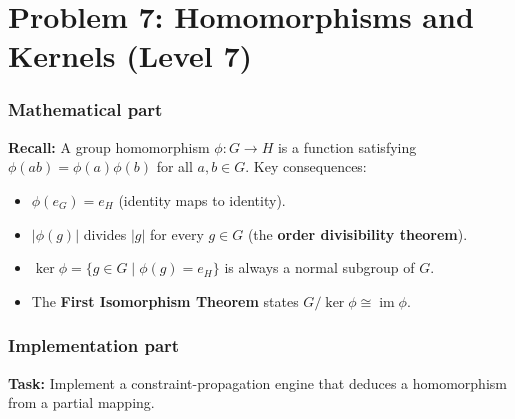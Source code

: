 \documentclass[11pt]{article}
\begin{document}
\section*{Problem 7: Homomorphisms and Kernels (Level 7)}

\subsubsection*{Mathematical part}
\textbf{Recall:} A group homomorphism $\phi: G \to H$ is a function satisfying $\phi(ab) = \phi(a)\phi(b)$ for all $a, b \in G$. Key consequences:
\begin{itemize}
    \item $\phi(e_G) = e_H$ (identity maps to identity).
    \item $|\phi(g)|$ divides $|g|$ for every $g \in G$ (the \textbf{order divisibility theorem}).
    \item $\ker \phi = \{g \in G \mid \phi(g) = e_H\}$ is always a normal subgroup of $G$.
    \item The \textbf{First Isomorphism Theorem} states $G / \ker \phi \cong \operatorname{im} \phi$.
\end{itemize}

\subsubsection*{Implementation part}
\textbf{Task:} Implement a constraint-propagation engine that deduces a homomorphism from a partial mapping.
\end{document}
